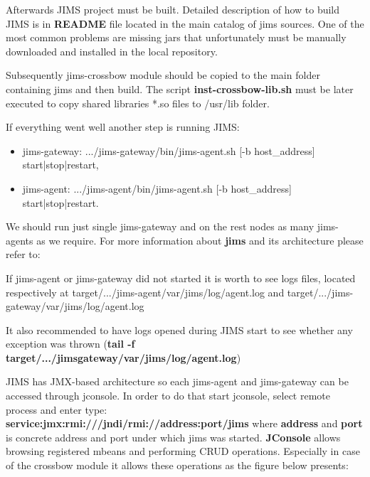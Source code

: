 \documentclass[11pt]{book}
\begin{document}
      Afterwards JIMS project must be built. Detailed description of how to build JIMS is in \textbf{README} file
      located in the main catalog of jims sources. One of the most common problems are missing jars that unfortunately
      must be manually downloaded and installed in the local repository.

      Subsequently jims-crossbow module should be copied to the main folder containing jims and then build. The script
      \textbf{inst-crossbow-lib.sh} must be	later executed to copy shared libraries *.so files to /usr/lib folder.

      If everything went well another step is running JIMS:

      \begin{itemize}
        \item jims-gateway: .../jims-gateway/bin/jims-agent.sh [-b host\_address] start|stop|restart,
        \item jims-agent: .../jims-agent/bin/jims-agent.sh [-b host\_address] start|stop|restart.
      \end{itemize}

      We should run just single jims-gateway and on the rest nodes as many jims-agents as we require. For more
      information about \textbf{jims} and its architecture please refer to:



      If jims-agent or jims-gateway did not started it is worth to see logs files, located respectively at
      target/.../jims-agent/var/jims/log/agent.log and target/.../jims-gateway/var/jims/log/agent.log

      It also recommended to have logs opened during JIMS start to see whether any exception was thrown (\textbf{tail
      -f target/.../jims\-gateway/var/jims/log/agent.log})

      JIMS has JMX-based architecture so each jims-agent and jims-gateway can be accessed through jconsole. In order to do that start 
      jconsole, select remote process and enter type: \\ \textbf{service:jmx:rmi:///jndi/rmi://address:port/jims} where \textbf{address} and 
      \textbf{port} is concrete address and port under which jims was started. \textbf{JConsole} allows browsing registered mbeans and 
      performing CRUD operations. Especially in case of the crossbow module it allows these operations as
      the figure below presents:
\end{document}
